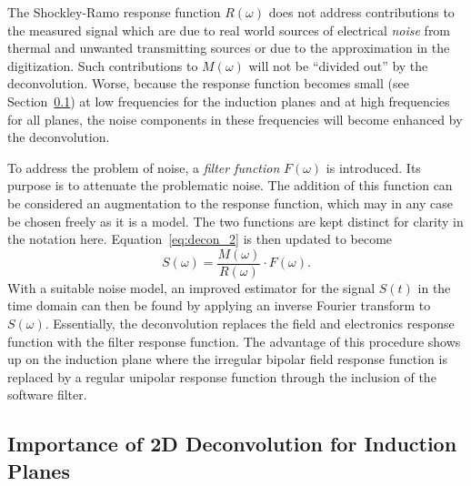 The Shockley-Ramo response function $R(\omega)$ does not address
contributions to the measured signal which are due to real world
sources of electrical \textit{noise} from thermal and unwanted transmitting
sources or due to the approximation in the digitization.
Such contributions to $M(\omega)$ will not be ``divided out'' by the deconvolution.
Worse, because the response function becomes small (see Section~\ref{sec:decon-2D-ind}) %
at low 
frequencies for the induction planes and at high frequencies for all
planes, the noise components in these frequencies will become
enhanced by the deconvolution.

To address the problem of noise, a \textit{filter function} $F(\omega)$ is
introduced.  Its purpose is to attenuate the problematic noise.  The
addition of this function can be considered an augmentation to the
response function, which may in any case be chosen freely as it is a model.  
The two functions are kept distinct for clarity in the notation here.
Equation~\ref{eq:decon_2} is then updated to become
\begin{equation}\label{eq:decon_filt}
S(\omega) = \frac{M(\omega)}{R(\omega)} \cdot F(\omega).
\end{equation}
With a suitable noise model, an improved estimator for the signal
$S(t)$ in the time domain can then be found by applying an inverse Fourier 
transform to $S(\omega)$.  Essentially, the deconvolution replaces the field and 
electronics response function with the filter response function. The 
advantage of this procedure shows up on the induction plane where the irregular bipolar 
field response function is replaced by a regular unipolar response function through
the inclusion of the software filter. 


\subsection{Importance of 2D Deconvolution for Induction Planes}
\label{sec:decon-2D-ind}

